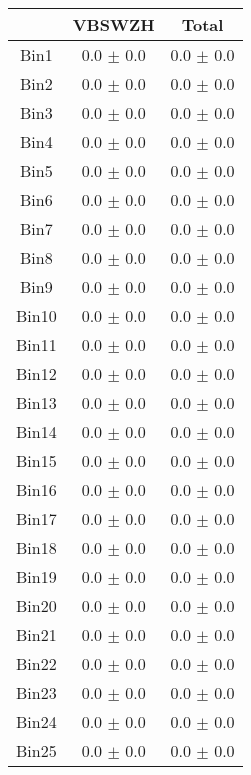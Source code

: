   \begin{tabular}{|c|c|c|}
  \hline
      & VBSWZH & Total \\ \cline{1-3} 
     \hline\hline
     Bin1 & 0.0 $\pm$ 0.0 & 0.0 $\pm$ 0.0 \\ \cline{1-3} 
     Bin2 & 0.0 $\pm$ 0.0 & 0.0 $\pm$ 0.0 \\ \cline{1-3} 
     Bin3 & 0.0 $\pm$ 0.0 & 0.0 $\pm$ 0.0 \\ \cline{1-3} 
     Bin4 & 0.0 $\pm$ 0.0 & 0.0 $\pm$ 0.0 \\ \cline{1-3} 
     Bin5 & 0.0 $\pm$ 0.0 & 0.0 $\pm$ 0.0 \\ \cline{1-3} 
     Bin6 & 0.0 $\pm$ 0.0 & 0.0 $\pm$ 0.0 \\ \cline{1-3} 
     Bin7 & 0.0 $\pm$ 0.0 & 0.0 $\pm$ 0.0 \\ \cline{1-3} 
     Bin8 & 0.0 $\pm$ 0.0 & 0.0 $\pm$ 0.0 \\ \cline{1-3} 
     Bin9 & 0.0 $\pm$ 0.0 & 0.0 $\pm$ 0.0 \\ \cline{1-3} 
     Bin10 & 0.0 $\pm$ 0.0 & 0.0 $\pm$ 0.0 \\ \cline{1-3} 
     Bin11 & 0.0 $\pm$ 0.0 & 0.0 $\pm$ 0.0 \\ \cline{1-3} 
     Bin12 & 0.0 $\pm$ 0.0 & 0.0 $\pm$ 0.0 \\ \cline{1-3} 
     Bin13 & 0.0 $\pm$ 0.0 & 0.0 $\pm$ 0.0 \\ \cline{1-3} 
     Bin14 & 0.0 $\pm$ 0.0 & 0.0 $\pm$ 0.0 \\ \cline{1-3} 
     Bin15 & 0.0 $\pm$ 0.0 & 0.0 $\pm$ 0.0 \\ \cline{1-3} 
     Bin16 & 0.0 $\pm$ 0.0 & 0.0 $\pm$ 0.0 \\ \cline{1-3} 
     Bin17 & 0.0 $\pm$ 0.0 & 0.0 $\pm$ 0.0 \\ \cline{1-3} 
     Bin18 & 0.0 $\pm$ 0.0 & 0.0 $\pm$ 0.0 \\ \cline{1-3} 
     Bin19 & 0.0 $\pm$ 0.0 & 0.0 $\pm$ 0.0 \\ \cline{1-3} 
     Bin20 & 0.0 $\pm$ 0.0 & 0.0 $\pm$ 0.0 \\ \cline{1-3} 
     Bin21 & 0.0 $\pm$ 0.0 & 0.0 $\pm$ 0.0 \\ \cline{1-3} 
     Bin22 & 0.0 $\pm$ 0.0 & 0.0 $\pm$ 0.0 \\ \cline{1-3} 
     Bin23 & 0.0 $\pm$ 0.0 & 0.0 $\pm$ 0.0 \\ \cline{1-3} 
     Bin24 & 0.0 $\pm$ 0.0 & 0.0 $\pm$ 0.0 \\ \cline{1-3} 
     Bin25 & 0.0 $\pm$ 0.0 & 0.0 $\pm$ 0.0 \\ \cline{1-3} 

\end{tabular}
